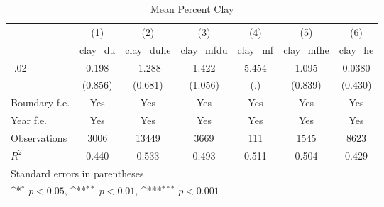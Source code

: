 \begin{table}[htbp]\centering
\def\sym#1{\ifmmode^{#1}\else\(^{#1}\)\fi}
\caption{Mean Percent Clay}
\begin{tabular}{l*{6}{c}}
\hline\hline
                    &\multicolumn{1}{c}{(1)}&\multicolumn{1}{c}{(2)}&\multicolumn{1}{c}{(3)}&\multicolumn{1}{c}{(4)}&\multicolumn{1}{c}{(5)}&\multicolumn{1}{c}{(6)}\\
                    &\multicolumn{1}{c}{clay\_du}&\multicolumn{1}{c}{clay\_duhe}&\multicolumn{1}{c}{clay\_mfdu}&\multicolumn{1}{c}{clay\_mf}&\multicolumn{1}{c}{clay\_mfhe}&\multicolumn{1}{c}{clay\_he}\\
\hline
-.02                &       0.198         &      -1.288         &       1.422         &       5.454         &       1.095         &      0.0380         \\
                    &     (0.856)         &     (0.681)         &     (1.056)         &         (.)         &     (0.839)         &     (0.430)         \\
[1em]
Boundary f.e.       &         Yes         &         Yes         &         Yes         &         Yes         &         Yes         &         Yes         \\
[1em]
Year f.e.           &         Yes         &         Yes         &         Yes         &         Yes         &         Yes         &         Yes         \\
\hline
Observations        &        3006         &       13449         &        3669         &         111         &        1545         &        8623         \\
\(R^{2}\)           &       0.440         &       0.533         &       0.493         &       0.511         &       0.504         &       0.429         \\
\hline\hline
\multicolumn{7}{l}{\footnotesize Standard errors in parentheses}\\
\multicolumn{7}{l}{\footnotesize \sym{*} \(p<0.05\), \sym{**} \(p<0.01\), \sym{***} \(p<0.001\)}\\
\end{tabular}
\end{table}

